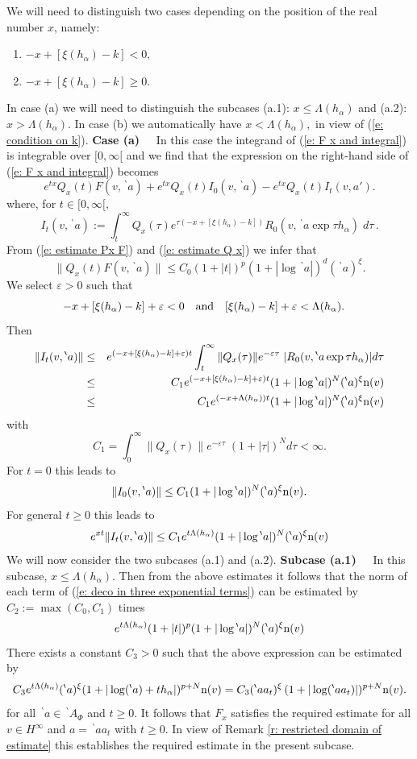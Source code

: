 \documentclass[12pt,a4paper]{article}
\def\medno{\medbreak\noindent}
\def\itema{\vspace{-1mm}\item[{\rm (a)}]}
\def\itemb{\item[{\rm (b)}]}
\def\ga{\alpha}
\def\ge{\varepsilon}
\numberwithin{Thm}{section}
\numberwithin{equation}{section}
\def\gL{\Lambda}
\numberwithin{equation}{section}
\def\gL{\Lambda}
\def\bp{\!{\,}^\backprime}
\begin{document}
We will need to distinguish two cases
depending on the position of the real number $x$,
namely: 
\begin{enumerate}
\itema $-x + [\xi(h_\ga)  - k]  < 0,$ 
\itemb $-x + [\xi(h_\ga) - k] \geq 0.$ 
\end{enumerate}
In case (a) we will need to distinguish the subcases 
(a.1): $x \leq \gL(h_\ga)$ and 
(a.2): $x >  \gL(h_\ga). $ 
In case  (b) we automatically have $ x < \gL(h_\ga),$ in view of 
(\ref{e: condition on k}).
\medno
{\bf Case (a)\ \ } In this case the integrand of (\ref{e: F x and integral}) is integrable over $[0, \infty[$ 
and we find that the expression on the right-hand side of (\ref{e: F x and integral}) 
becomes 
\begin{equation}
\label{e: deco in three exponential terms}
e^{tx} Q_x(t) F(v,\bp a) +  e^{tx} Q_x(t)   I_0(v, \bp a)  - 
e^{t x}Q_x(t) I_t (v,a ').
\end{equation}
where, for $t \in [0,\infty[,$ 
$$ 
I_t( v, \bp a) := \int_t^\infty  Q_x(\tau) e^{\tau(- x + [\xi(h_\ga) - k])} 
R_{0} (v, \bp a \exp \tau h_\ga)\; d\tau\,.
$$%
From (\ref{e: estimate Px F}) and (\ref{e: estimate Q x}) we infer that  
$$ 
\|Q_x(t) F(v,\bp a)\| \leq C_0 (1 + |t|)^p (1 + |\log \bp a|)^d (\bp a)^\xi.
$$%
We select $\ge > 0$ such that 
$$ 
-x + [\xi(h_\ga) - k] +\ge < 0 \quad {\rm and}\quad [ \xi(h_\ga)  - k] +\ge < \gL(h_\ga).
\quad 
$$%
Then
\begin{eqnarray}
\|I_t( v, \bp a)\| & \leq  & e^{(-x +[ \xi(h_\ga) - k]+\ge)t } \int_t^\infty \|Q_x(\tau)\| e^{-\ge \tau}\; |R_{0} (v, \bp a \exp \tau h_\ga)| d\tau \nonumber \\
& \leq & C_1 e^{(-x +[ \xi (h_\ga) - k]+\ge)t }(1 + |\log \bp a|)^N (\bp a)^\xi {\rm n } ( v)\nonumber \\ \nonumber
&\leq & C_1 e^{(-x + \gL(h_\ga) )t }(1 + |\log \bp a|)^N (\bp a)^\xi {\rm n } ( v)
\end{eqnarray}
with 
$$ 
C_1 = \int_0^\infty \|Q_x(\tau)\| e^{-\ge \tau}\; ( 1 + |\tau|)^N d\tau < \infty. 
$$%
For $t=0$ this leads to 
$$
\|I_0(v,\bp a)\|\leq C_1 (1 + |\log \bp a|)^N (\bp a)^\xi {\rm n } ( v).
$$%
For general $t\geq 0$ this leads to 
\begin{equation} 
\label{e: estimate I t v bp a}
e^{xt} \|I_t(v,\bp a)\| \leq C_1 e^{t \gL(h_\ga)}(1 + |\log \bp a|)^N (\bp a)^\xi {\rm n } ( v)
\end{equation} 
We will now consider the two subcases (a.1) and (a.2).
\medno
{\bf Subcase (a.1)\ \ } In this subcase, $x \leq  \gL(h_\ga).$ Then from the above estimates it follows that the norm of each term of (\ref{e: deco in three exponential terms}) can be estimated by
$C_2:= \max (C_0, C_1)$ times 
$$ 
e^{t \gL(h_\ga)}(1 + |t|)^p (1 + |\log \bp a|)^N (\bp a)^\xi {\rm n } ( v)
$$%
There exists a constant $C_3 > 0$ such that the above expression
can be estimated by 
$$ 
C_3 e^{t \gL(h_\ga)} (\bp a)^\xi (1+ |\log (\bp a)+ th_\ga|)^{p+N} {\rm n}(v)
=
C_3 (\bp a a_t)^\xi \, (1 +|\log(\bp a a_t)|)^{p+N} {\rm n}(v).
$$%
for all $\bp a \in \bp A_\Phi$ and $t \geq 0.$ It follows that $F_x$ satisfies 
the required estimate for all $v \in H^\infty$ and $a = \bp aa_t$ with $t \geq 0.$ 
In view of Remark \ref{r: restricted domain of estimate} this establishes the required estimate in the present subcase.
\end{document}
